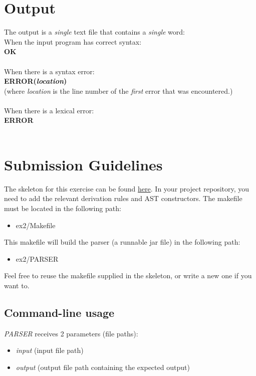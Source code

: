 \documentclass{article}
\begin{document}
\section{Output}
The output is a \textit{single} text file that contains a \textit{single} word: \\
When the input program has correct syntax: \\
\textbf{OK} \\ \\
When there is a syntax error: \\
\textbf{ERROR(\textit{location})} \\
(where \textit{location} is the line number of the \textit{first} error that was encountered.) \\ \\
When there is a lexical error: \\
\textbf{ERROR} \\ \\


\section{Submission Guidelines}
The skeleton for this exercise can be found \href{https://github.com/davidtr1037/compilation-tau/tree/master/src/ex2}{here}.
In your project repository, you need to add the relevant derivation rules and AST constructors.
The makefile must be located in the following path:
\begin{itemize}
    \item ex2/Makefile
\end{itemize}
This makefile will build the parser (a runnable jar file) in the following path:
\begin{itemize}
    \item ex2/PARSER
\end{itemize}
Feel free to reuse the makefile supplied in the skeleton, or write a new one if you want to.

\subsection{Command-line usage}
\textit{PARSER} receives 2 parameters (file paths):
\begin{itemize}
    \item \textit{input} (input file path)
    \item \textit{output} (output file path containing the expected output)
\end{itemize}
\end{document}
